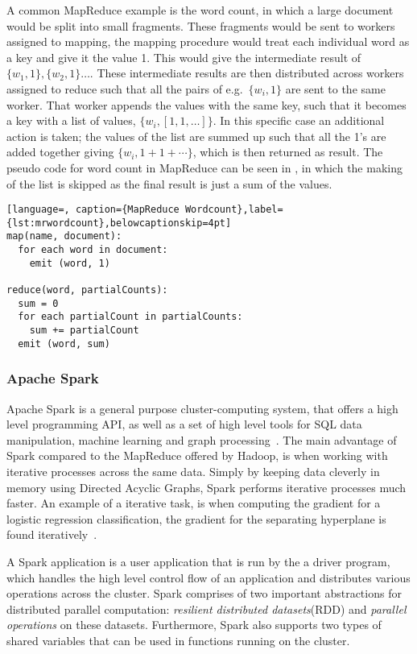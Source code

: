 A common MapReduce example is the word count, in which a large document would be split into small fragments. These fragments would be sent to workers assigned to mapping, the mapping procedure would treat each individual word as a key and give it the value 1. This would give the intermediate result of $\{w_1,1\}, \{w_2,1\} \dots$. These intermediate results are then distributed across workers assigned to reduce such that all the pairs of e.g.\ $\{w_i,1\}$ are sent to the same worker. That worker appends the values with the same key, such that it becomes a key with a list of values, $\{w_i, [1,1,\dots] \}$. In this specific case an additional action is taken; the values of the list are summed up such that all the 1's are added together giving $\{w_i,1+1+\cdots \}$, which is then returned as result. The pseudo code for word count in MapReduce can be seen in , in which the making of the list is skipped as the final result is just a sum of the values. 
\begin{lstlisting}[language=, caption={MapReduce Wordcount},label={lst:mrwordcount},belowcaptionskip=4pt]
map(name, document):
  for each word in document:
    emit (word, 1)

reduce(word, partialCounts):
  sum = 0
  for each partialCount in partialCounts:
    sum += partialCount
  emit (word, sum)
\end{lstlisting}

\subsubsection{Apache Spark}\label{sec:spark}
Apache Spark is a general purpose cluster-computing system, that offers a high level programming API, as well as a set of high level tools for SQL data manipulation, machine learning and graph processing~\cite{sparkintro}. The main advantage of Spark compared to the MapReduce offered by Hadoop, is when working with iterative processes across the same data. Simply by keeping data cleverly in memory using Directed Acyclic Graphs, Spark performs iterative processes much faster. An example of a iterative task, is when computing the gradient for a logistic regression classification, the gradient for the separating hyperplane is found iteratively~\cite{ApacheSpark}.

A Spark application is a user application that is run by the a driver program, which handles the high level control flow of an application and distributes various operations across the cluster. Spark comprises of two important abstractions for distributed parallel computation: \emph{resilient distributed datasets}(RDD) and \emph{parallel operations} on these datasets. Furthermore, Spark also supports two types of shared variables that can be used in functions running on the cluster.

